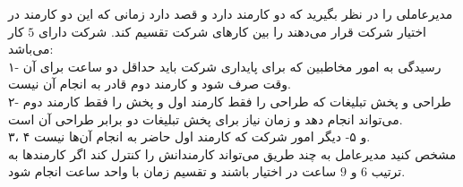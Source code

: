\EXERCISE
مدیرعاملی را در نظر بگیرید که دو کارمند دارد و قصد دارد زمانی که این دو کارمند در اختیار شرکت قرار می‌دهند را بین کارهای شرکت تقسیم کند. شرکت دارای
$5$
کار می‌باشد:
\\
۱- رسیدگی به امور مخاطبین که برای پایداری شرکت باید حداقل دو ساعت برای آن وقت صرف شود و کارمند دوم قادر به انجام آن نیست.
\\
۲- طراحی و پخش تبلیغات که طراحی را فقط کارمند اول و پخش را فقط کارمند دوم می‌تواند انجام دهد و زمان نیاز برای پخش تبلیغات دو برابر طراحی آن است.
\\
۳، ۴ و ۵- دیگر امور شرکت که کارمند اول حاضر به انجام آن‌ها نیست.
\\
مشخص کنید مدیرعامل به چند طریق می‌تواند کارمندانش را کنترل کند اگر کارمندها به ترتیب
$6$
و
$9$
ساعت در اختیار باشند و تقسیم زمان با واحد ساعت انجام شود.

